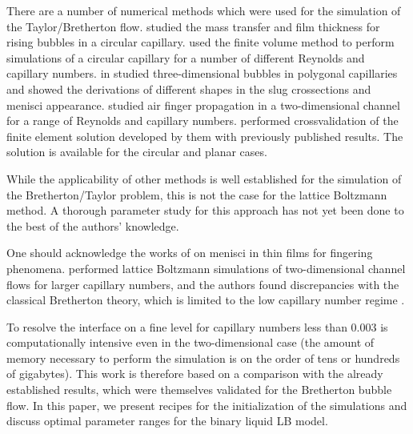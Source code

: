 \documentclass{article}
\begin{document}
There are a number of numerical methods which
were used for the simulation of the Taylor/Bretherton flow.
\citet{vanbaten-circular} studied the mass transfer and film
thickness for rising bubbles in a circular capillary.
\citet{kreutzer-pressure-drop} used the finite volume method to perform
simulations of a circular capillary for a number of different
Reynolds and capillary numbers. \citeauthor{wong-films} in
\cite{wong-films,wong-pressure} studied three-dimensional bubbles in
polygonal capillaries and showed the derivations of different shapes in the
slug crossections and menisci appearance.
\citet{heil-bretherton,ingham-plates} studied air finger propagation in
a two-dimensional channel for a range of Reynolds and capillary
numbers. \citet{giavedoni-numerical} performed crossvalidation of the
finite element solution developed by them with previously published results.
The solution is available for the circular and planar cases.

While the applicability of other methods is well established for the
simulation of the Bretherton/Taylor problem, this is not the case for
the lattice Boltzmann method. A thorough parameter study for this approach
has not yet been done to the best of the authors' knowledge.

One should acknowledge the works of \citet{pagonabarraga-fingers} on menisci
in thin films for fingering phenomena. \citet{sehgal-microchannel} performed lattice Boltzmann
simulations of two-dimensional channel flows for larger capillary numbers, and
the authors found discrepancies with the classical Bretherton theory, which
is limited to the low capillary number regime \cite{giavedoni-numerical}.

To resolve the interface on a fine level for capillary numbers less than
$0.003$ is computationally intensive even in the two-dimensional case
(the amount of memory necessary to perform the simulation is on the order
of tens or hundreds of gigabytes).  This work is therefore based on a
comparison with the already established results, which were themselves
validated for the Bretherton bubble flow.  In this paper, we present
recipes for the initialization of the simulations and discuss optimal
parameter ranges for the binary liquid LB model.
\end{document}
